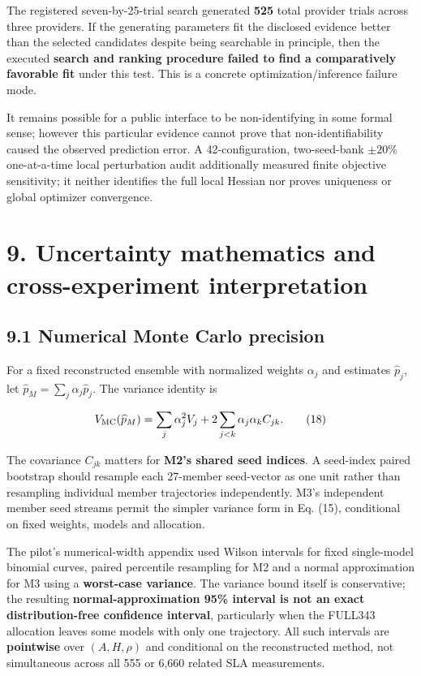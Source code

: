 \documentclass[10pt,a4paper]{article}
\begin{document}
The registered seven-by-25-trial search generated \textbf{525} total provider trials across three providers. If the generating parameters fit the disclosed evidence better than the selected candidates despite being searchable in principle, then the executed \textbf{search and ranking procedure failed to find a comparatively favorable fit} under this test. This is a concrete optimization/inference failure mode.

It remains possible for a public interface to be non-identifying in some formal sense; however this particular evidence cannot prove that non-identifiability caused the observed prediction error. A 42-configuration, two-seed-bank $\pm20\%$ one-at-a-time local perturbation audit additionally measured finite objective sensitivity; it neither identifies the full local Hessian nor proves uniqueness or global optimizer convergence.

\section*{9. Uncertainty mathematics and cross-experiment interpretation}

\subsection*{9.1 Numerical Monte Carlo precision}

For a fixed reconstructed ensemble with normalized weights $\alpha_j$ and estimates $\widehat p_j$, let $\widehat p_M=\sum_j\alpha_j\widehat p_j$. The variance identity is

\begin{equation*}
V_{\rm MC}(\widehat p_M)
=\sum_j\alpha_j^2 V_j+
2\sum_{j<k}\alpha_j\alpha_k C_{jk}.
\tag{18}
\end{equation*}

The covariance $C_{jk}$ matters for \textbf{M2's shared seed indices}. A seed-index paired bootstrap should resample each 27-member seed-vector as one unit rather than resampling individual member trajectories independently. M3's independent member seed streams permit the simpler variance form in Eq. (15), conditional on fixed weights, models and allocation.

The pilot's numerical-width appendix used Wilson intervals for fixed single-model binomial curves, paired percentile resampling for M2 and a normal approximation for M3 using a \textbf{worst-case variance}. The variance bound itself is conservative; the resulting \textbf{normal-approximation 95\% interval is not an exact distribution-free confidence interval}, particularly when the FULL343 allocation leaves some models with only one trajectory. All such intervals are \textbf{pointwise} over $(A,H,\rho)$ and conditional on the reconstructed method, not simultaneous across all 555 or 6,660 related SLA measurements.
\end{document}
